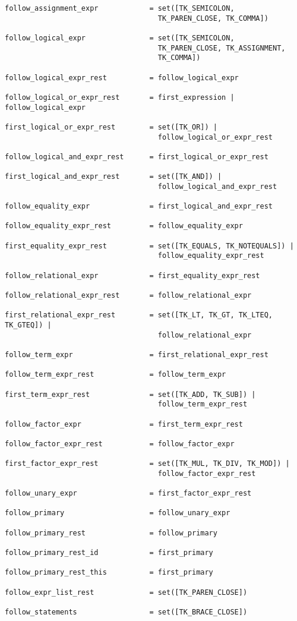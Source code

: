 \documentclass [a4paper,titlepage]{report}
\begin{document}
\begin{verbatim}
follow_assignment_expr            = set([TK_SEMICOLON, 
                                    TK_PAREN_CLOSE, TK_COMMA])

follow_logical_expr               = set([TK_SEMICOLON, 
                                    TK_PAREN_CLOSE, TK_ASSIGNMENT, 
                                    TK_COMMA])

follow_logical_expr_rest          = follow_logical_expr

follow_logical_or_expr_rest       = first_expression | follow_logical_expr

first_logical_or_expr_rest        = set([TK_OR]) | 
                                    follow_logical_or_expr_rest

follow_logical_and_expr_rest      = first_logical_or_expr_rest

first_logical_and_expr_rest       = set([TK_AND]) | 
                                    follow_logical_and_expr_rest

follow_equality_expr              = first_logical_and_expr_rest

follow_equality_expr_rest         = follow_equality_expr

first_equality_expr_rest          = set([TK_EQUALS, TK_NOTEQUALS]) | 
                                    follow_equality_expr_rest

follow_relational_expr            = first_equality_expr_rest

follow_relational_expr_rest       = follow_relational_expr

first_relational_expr_rest        = set([TK_LT, TK_GT, TK_LTEQ, TK_GTEQ]) | 
                                    follow_relational_expr

follow_term_expr                  = first_relational_expr_rest

follow_term_expr_rest             = follow_term_expr

first_term_expr_rest              = set([TK_ADD, TK_SUB]) | 
                                    follow_term_expr_rest

follow_factor_expr                = first_term_expr_rest

follow_factor_expr_rest           = follow_factor_expr

first_factor_expr_rest            = set([TK_MUL, TK_DIV, TK_MOD]) | 
                                    follow_factor_expr_rest

follow_unary_expr                 = first_factor_expr_rest

follow_primary                    = follow_unary_expr

follow_primary_rest               = follow_primary

follow_primary_rest_id            = first_primary

follow_primary_rest_this          = first_primary

follow_expr_list_rest             = set([TK_PAREN_CLOSE])

follow_statements                 = set([TK_BRACE_CLOSE])
\end{verbatim}
\end{document}
